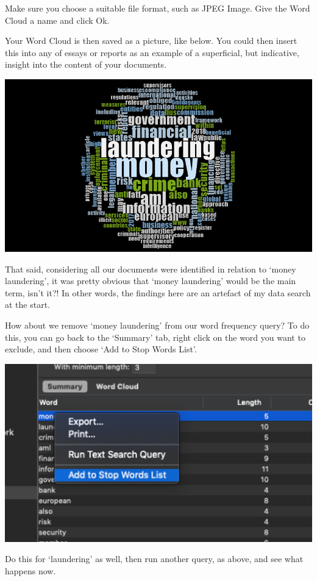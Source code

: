\documentclass[
]{book}
\begin{document}
Make sure you choose a suitable file format, such as JPEG Image. Give the Word Cloud a name and click Ok.

Your Word Cloud is then saved as a picture, like below. You could then insert this into any of essays or reports as an example of a superficial, but indicative, insight into the content of your documents.

\includegraphics{imgs/word_cloud3.png}

That said, considering all our documents were identified in relation to `money laundering', it was pretty obvious that `money laundering' would be the main term, isn't it?! In other words, the findings here are an artefact of my data search at the start.

How about we remove `money laundering' from our word frequency query? To do this, you can go back to the `Summary' tab, right click on the word you want to exclude, and then choose `Add to Stop Words List'.

\includegraphics{imgs/add_stop_word.png}

Do this for `laundering' as well, then run another query, as above, and see what happens now.
\end{document}
